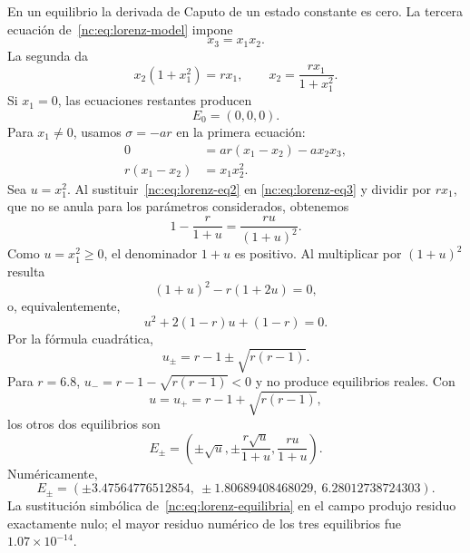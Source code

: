 En un equilibrio la derivada de Caputo de un estado constante es cero. La
tercera ecuación de~\eqref{nc:eq:lorenz-model} impone
\begin{equation}
 x_3=x_1x_2.
 \label{nc:eq:lorenz-eq1}
\end{equation}
La segunda da
\begin{equation}
 x_2(1+x_1^2)=r x_1,
 \qquad
 x_2=\frac{r x_1}{1+x_1^2}.
 \label{nc:eq:lorenz-eq2}
\end{equation}
Si \(x_1=0\), las ecuaciones restantes producen
\begin{equation}
 E_0=(0,0,0).
\end{equation}
Para \(x_1\neq0\), usamos \(\sigma=-ar\) en la primera ecuación:
\begin{align}
 0&=ar(x_1-x_2)-a x_2x_3,\\
 r(x_1-x_2)&=x_1x_2^2.
 \label{nc:eq:lorenz-eq3}
\end{align}
Sea \(u=x_1^2\). Al sustituir~\eqref{nc:eq:lorenz-eq2} en
\eqref{nc:eq:lorenz-eq3} y dividir por \(rx_1\), que no se anula para
los parámetros considerados, obtenemos
\[
 1-\frac{r}{1+u}=\frac{ru}{(1+u)^2}.
\]
Como \(u=x_1^2\ge0\), el denominador \(1+u\) es positivo. Al multiplicar
por \((1+u)^2\) resulta
\begin{equation}
 (1+u)^2-r(1+2u)=0,
\end{equation}
o, equivalentemente,
\begin{equation}
 u^2+2(1-r)u+(1-r)=0.
\end{equation}
Por la fórmula cuadrática,
\begin{equation}
 u_{\pm}=r-1\pm\sqrt{r(r-1)}.
 \label{nc:eq:lorenz-u}
\end{equation}
Para \(r=6.8\), \(u_-=r-1-\sqrt{r(r-1)}<0\) y no produce equilibrios
reales. Con
\begin{equation}
 u=u_+=r-1+\sqrt{r(r-1)},
\end{equation}
los otros dos equilibrios son
\begin{equation}
 E_{\pm}=\left(
 \pm\sqrt u,
 \pm\frac{r\sqrt u}{1+u},
 \frac{ru}{1+u}
 \right).
 \label{nc:eq:lorenz-equilibria}
\end{equation}
Numéricamente,
\begin{equation}
 E_{\pm}=(\pm3.47564776512854,
 \ \pm1.80689408468029,
 \ 6.28012738724303).
 \label{nc:eq:lorenz-equilibria-num}
\end{equation}
La sustitución simbólica de~\eqref{nc:eq:lorenz-equilibria} en el campo produjo
residuo exactamente nulo; el mayor residuo numérico de los tres equilibrios fue
\(1.07\times10^{-14}\).

